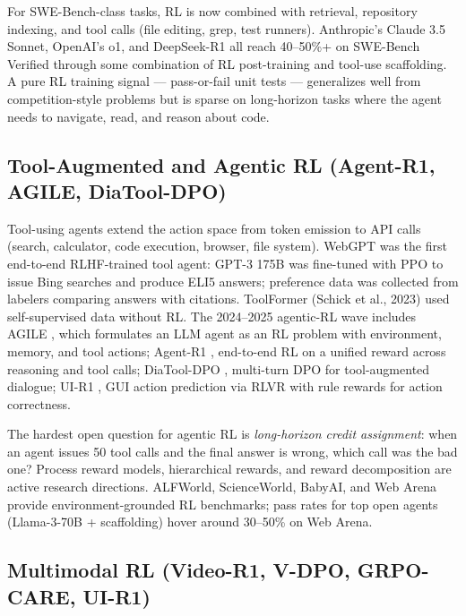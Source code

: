 \documentclass{article}
\begin{document}
For SWE-Bench-class tasks, RL is now combined with retrieval, repository indexing, and tool calls (file editing, grep, test runners). Anthropic's Claude 3.5 Sonnet, OpenAI's o1, and DeepSeek-R1 all reach 40--50\%+ on SWE-Bench Verified through some combination of RL post-training and tool-use scaffolding. A pure RL training signal --- pass-or-fail unit tests --- generalizes well from competition-style problems but is sparse on long-horizon tasks where the agent needs to navigate, read, and reason about code.

\subsection{Tool-Augmented and Agentic RL (Agent-R1, AGILE, DiaTool-DPO)}\label{tool-augmented-and-agentic-rl-agent-r1-agile-diatool-dpo}

Tool-using agents extend the action space from token emission to API calls (search, calculator, code execution, browser, file system). WebGPT \citep{nakano20212021} was the first end-to-end RLHF-trained tool agent: GPT-3 175B was fine-tuned with PPO to issue Bing searches and produce ELI5 answers; preference data was collected from labelers comparing answers with citations. ToolFormer (Schick et al., 2023) used self-supervised data without RL. The 2024--2025 agentic-RL wave includes AGILE \citep{feng20242024}, which formulates an LLM agent as an RL problem with environment, memory, and tool actions; Agent-R1 \citep{cheng20252025}, end-to-end RL on a unified reward across reasoning and tool calls; DiaTool-DPO \citep{jung20252025}, multi-turn DPO for tool-augmented dialogue; UI-R1 \citep{lu20252025}, GUI action prediction via RLVR with rule rewards for action correctness.

The hardest open question for agentic RL is \emph{long-horizon credit assignment}: when an agent issues 50 tool calls and the final answer is wrong, which call was the bad one? Process reward models, hierarchical rewards, and reward decomposition are active research directions. ALFWorld, ScienceWorld, BabyAI, and Web Arena provide environment-grounded RL benchmarks; pass rates for top open agents (Llama-3-70B + scaffolding) hover around 30--50\% on Web Arena.

\subsection{Multimodal RL (Video-R1, V-DPO, GRPO-CARE, UI-R1)}\label{multimodal-rl-video-r1-v-dpo-grpo-care-ui-r1}
\end{document}
